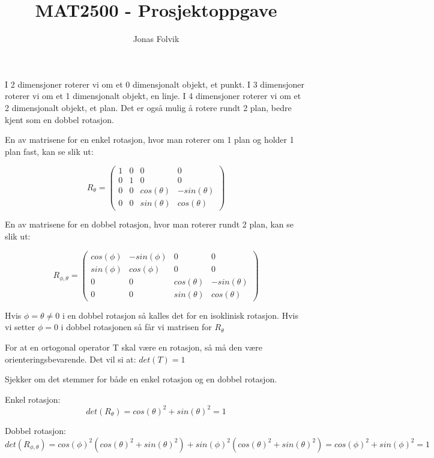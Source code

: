 \documentclass[a4paper,10pt,english]{article}
\title{MAT2500 - Prosjektoppgave}
\author{Jonas Folvik}
\begin{document}
    
    \maketitle
    
    I 2 dimensjoner roterer vi om et 0 dimensjonalt objekt, et punkt. I 3 dimensjoner roterer vi om et 1 dimensjonalt objekt, en linje.
    I 4 dimensjoner roterer vi om et 2 dimensjonalt objekt, et plan. Det er også mulig å rotere rundt 2 plan, bedre kjent som en dobbel rotasjon.

    En av matrisene for en enkel rotasjon, hvor man roterer om 1 plan og holder 1 plan fast, kan se slik ut:

    $$R_{\theta} = \left(
    \begin{matrix}
        1 & 0 & 0 & 0 \\
        0 & 1 & 0 & 0 \\
        0 & 0 & cos(\theta) & -sin(\theta) \\
        0 & 0 & sin(\theta) &  cos(\theta)
    \end{matrix}
    \right)$$

    En av matrisene for en dobbel rotasjon, hvor man roterer rundt 2 plan, kan se slik ut:

    $$
    R_{\phi, \theta} = \left(
    \begin{matrix}
        cos(\phi) & -sin(\phi) & 0 & 0 \\
        sin(\phi) &  cos(\phi) & 0 & 0 \\
        0 & 0 & cos(\theta) & -sin(\theta) \\
        0 & 0 & sin(\theta) &  cos(\theta)
    \end{matrix}
    \right)$$

    Hvis $\phi = \theta \neq 0$ i en dobbel rotasjon så kalles det for en isoklinisk rotasjon. Hvis vi setter $\phi = 0$ i dobbel rotasjonen så får vi matrisen for $R_{\theta}$

    For at en ortogonal operator T skal være en rotasjon, så må den være orienteringsbevarende. Det vil si at: $det(T) = 1$

    Sjekker om det stemmer for både en enkel rotasjon og en dobbel rotasjon.

    Enkel rotasjon:
    $$
    det(R_{\theta}) = cos(\theta)^{2} + sin(\theta)^{2} = 1
    $$

    Dobbel rotasjon:
    $$
    det(R_{\phi, \theta}) = cos(\phi)^{2}(cos(\theta)^{2} + sin(\theta)^{2}) + sin(\phi)^{2}(cos(\theta)^{2} + sin(\theta)^{2}) = cos(\phi)^{2} + sin(\phi)^{2} = 1
    $$
\end{document}
